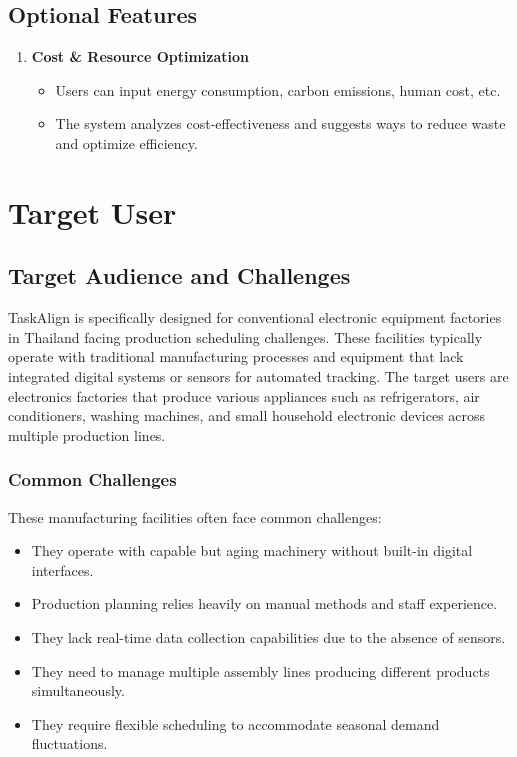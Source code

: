 \subsection{Optional Features}
\label{subsection:optional features}
\begin{enumerate}[leftmargin=80pt]
    \item \textbf{Cost \& Resource Optimization}
    \begin{itemize}
        \item Users can input energy consumption, carbon emissions, human cost, etc.
        \item The system analyzes cost-effectiveness and suggests ways to reduce waste and optimize efficiency.
    \end{itemize}
\end{enumerate}



\section{Target User}
\label{section:target-user}

\subsection{Target Audience and Challenges}

TaskAlign is specifically designed for conventional electronic equipment factories in Thailand facing production scheduling challenges. These facilities typically operate with traditional manufacturing processes and equipment that lack integrated digital systems or sensors for automated tracking. The target users are electronics factories that produce various appliances such as refrigerators, air conditioners, washing machines, and small household electronic devices across multiple production lines.

\subsubsection{Common Challenges}
These manufacturing facilities often face common challenges:
\begin{itemize}
    \item They operate with capable but aging machinery without built-in digital interfaces.
    \item Production planning relies heavily on manual methods and staff experience.
    \item They lack real-time data collection capabilities due to the absence of sensors.
    \item They need to manage multiple assembly lines producing different products simultaneously.
    \item They require flexible scheduling to accommodate seasonal demand fluctuations.
\end{itemize}

